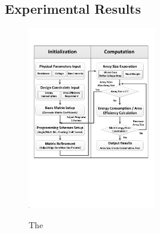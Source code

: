 \vspace{10pt}
\subsection{Experimental Results} 



\begin{figure}%
\centering
  \includegraphics[width=0.5\textwidth]{./figures/FlowChart.pdf}\\
  \caption{The}\label{fig:non_linear_A}
\end{figure} 